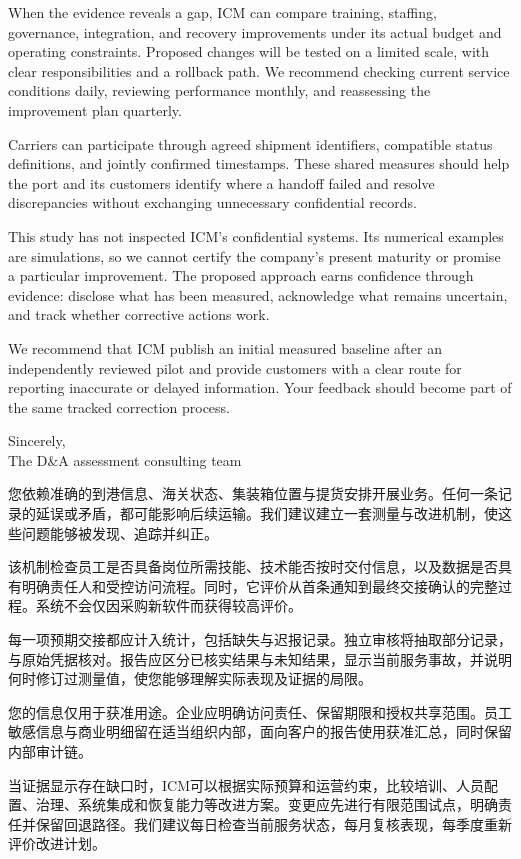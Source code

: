\begin{minipage}{\linewidth}
{When the evidence reveals a gap, ICM can compare training, staffing, governance, integration, and recovery improvements under its actual budget and operating constraints. Proposed changes will be tested on a limited scale, with clear responsibilities and a rollback path. We recommend checking current service conditions daily, reviewing performance monthly, and reassessing the improvement plan quarterly.

Carriers can participate through agreed shipment identifiers, compatible status definitions, and jointly confirmed timestamps. These shared measures should help the port and its customers identify where a handoff failed and resolve discrepancies without exchanging unnecessary confidential records.

This study has not inspected ICM's confidential systems. Its numerical examples are simulations, so we cannot certify the company's present maturity or promise a particular improvement. The proposed approach earns confidence through evidence: disclose what has been measured, acknowledge what remains uncertain, and track whether corrective actions work.

We recommend that ICM publish an initial measured baseline after an independently reviewed pilot and provide customers with a clear route for reporting inaccurate or delayed information. Your feedback should become part of the same tracked correction process.

\noindent Sincerely,\\The D\&A assessment consulting team
}{您依赖准确的到港信息、海关状态、集装箱位置与提货安排开展业务。任何一条记录的延误或矛盾，都可能影响后续运输。我们建议建立一套测量与改进机制，使这些问题能够被发现、追踪并纠正。

该机制检查员工是否具备岗位所需技能、技术能否按时交付信息，以及数据是否具有明确责任人和受控访问流程。同时，它评价从首条通知到最终交接确认的完整过程。系统不会仅因采购新软件而获得较高评价。

每一项预期交接都应计入统计，包括缺失与迟报记录。独立审核将抽取部分记录，与原始凭据核对。报告应区分已核实结果与未知结果，显示当前服务事故，并说明何时修订过测量值，使您能够理解实际表现及证据的局限。

您的信息仅用于获准用途。企业应明确访问责任、保留期限和授权共享范围。员工敏感信息与商业明细留在适当组织内部，面向客户的报告使用获准汇总，同时保留内部审计链。

当证据显示存在缺口时，ICM可以根据实际预算和运营约束，比较培训、人员配置、治理、系统集成和恢复能力等改进方案。变更应先进行有限范围试点，明确责任并保留回退路径。我们建议每日检查当前服务状态，每月复核表现，每季度重新评价改进计划。

}
\end{minipage}
